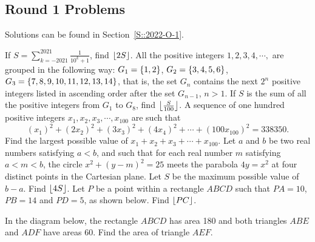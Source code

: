 \subsection{Round 1 Problems}

Solutions can be found in Section~\ref{S::2022-O-1}.

\begin{enumerate}
    \hyperrefitem[Q::2022-O-1-1] If $S = \displaystyle\sum_{k = -2021}^{2021} \frac{1}{10^k + 1}$, find $\left\lfloor 2S \right\rfloor$.
    \hyperrefitem[Q::2022-O-1-2] All the positive integers $1, 2, 3, 4, \cdots,$ are grouped in the following way: $G_1 = \left\lbrace 1, 2 \right\rbrace$, $G_2 = \left\lbrace 3, 4, 5, 6 \right\rbrace$, $G_3 = \left\lbrace 7, 8, 9, 10, 11, 12, 13, 14 \right\rbrace$, that is, the set $G_n$ contains the next $2^n$ positive integers listed in ascending order after the set $G_{n-1}$, $n > 1$. If $S$ is the sum of all the positive integers from $G_1$ to $G_8$, find $\left\lfloor \frac{S}{100} \right\rfloor$.
    \hyperrefitem[Q::2022-O-1-3] A sequence of one hundred positive integers $x_1, x_2, x_3, \cdots, x_{100}$ are such that \[(x_1)^2 + (2x_2)^2 + (3x_3)^2 + (4x_4)^2 + \cdots + (100x_{100})^2 = 338350.\] Find the largest possible value of $x_1 + x_2 + x_3 + \cdots + x_{100}$.
    \hyperrefitem[Q::2022-O-1-4] Let $a$ and $b$ be two real numbers satisfying $a < b$, and such that for each real number $m$ satisfying $a < m < b$, the circle $x^2 + (y-m)^2 = 25$ meets the parabola $4y = x^2$ at four distinct points in the Cartesian plane. Let $S$ be the maximum possible value of $b-a$. Find $\left\lfloor 4S \right\rfloor$.
    \hyperrefitem[Q::2022-O-1-5] Let $P$ be a point within a rectangle $ABCD$ such that $PA = 10$, $PB = 14$ and $PD = 5$, as shown below. Find $\left\lfloor PC \right\rfloor$.
    
    \begin{center}
    \end{center}
    \hyperrefitem[Q::2022-O-1-6] In the diagram below, the rectangle $ABCD$ has area 180 and both triangles $ABE$ and $ADF$ have areas 60. Find the area of triangle $AEF$.


\end{enumerate}
